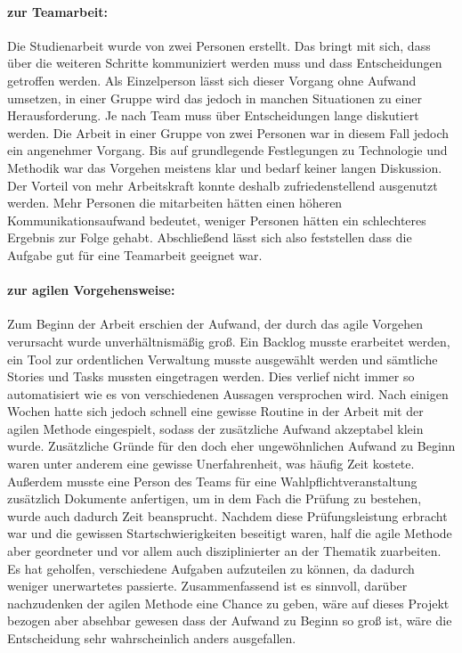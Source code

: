 \paragraph{zur Teamarbeit:} Die Studienarbeit wurde von zwei Personen erstellt. Das bringt mit sich, dass über die weiteren Schritte kommuniziert werden muss und dass Entscheidungen getroffen werden. Als Einzelperson lässt sich dieser Vorgang ohne Aufwand umsetzen, in einer Gruppe wird das jedoch in manchen Situationen zu einer Herausforderung. Je nach Team muss über Entscheidungen lange diskutiert werden. Die Arbeit in einer Gruppe von zwei Personen war in diesem Fall jedoch ein angenehmer Vorgang. Bis auf grundlegende Festlegungen zu Technologie und Methodik war das Vorgehen meistens klar und bedarf keiner langen Diskussion. Der Vorteil von mehr Arbeitskraft konnte deshalb zufriedenstellend ausgenutzt werden. Mehr Personen die mitarbeiten hätten einen höheren Kommunikationsaufwand bedeutet, weniger Personen hätten ein schlechteres Ergebnis zur Folge gehabt. Abschließend lässt sich also feststellen dass die Aufgabe gut für eine Teamarbeit geeignet war.

\paragraph{zur agilen Vorgehensweise:} Zum Beginn der Arbeit erschien der Aufwand, der durch das agile Vorgehen verursacht wurde unverhältnismäßig groß. Ein Backlog musste erarbeitet werden, ein Tool zur ordentlichen Verwaltung musste ausgewählt werden und sämtliche Stories und Tasks mussten eingetragen werden. Dies verlief nicht immer so automatisiert wie es von verschiedenen Aussagen versprochen wird. Nach einigen Wochen hatte sich jedoch schnell eine gewisse Routine in der Arbeit mit der agilen Methode eingespielt, sodass der zusätzliche Aufwand akzeptabel klein wurde. Zusätzliche Gründe für den doch eher ungewöhnlichen Aufwand zu Beginn waren unter anderem eine gewisse Unerfahrenheit, was häufig Zeit kostete. Außerdem musste eine Person des Teams für eine Wahlpflichtveranstaltung zusätzlich Dokumente anfertigen, um in dem Fach die Prüfung zu bestehen, wurde auch dadurch Zeit beansprucht. Nachdem diese Prüfungsleistung erbracht war und die gewissen Startschwierigkeiten beseitigt waren, half die agile Methode aber geordneter und vor allem auch disziplinierter an der Thematik zuarbeiten. Es hat geholfen, verschiedene Aufgaben aufzuteilen zu können, da dadurch weniger unerwartetes passierte. Zusammenfassend ist es sinnvoll, darüber nachzudenken der agilen Methode eine Chance zu geben, wäre auf dieses Projekt bezogen aber absehbar gewesen dass der Aufwand zu Beginn so groß ist, wäre die Entscheidung sehr wahrscheinlich anders ausgefallen.

